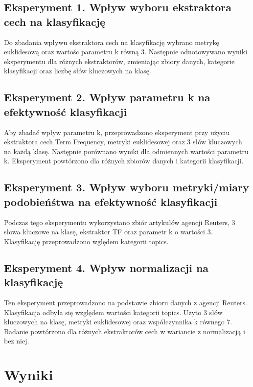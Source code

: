 \documentclass{classrep}
\begin{document}
\subsection{Eksperyment 1. Wpływ wyboru ekstraktora cech na klasyfikację}
Do zbadania wpływu ekstraktora cech na klasyfikację wybrano metrykę euklidesową oraz wartośc parametru k równą 3. Następnie odnotowywano wyniki eksperymentu dla różnych ekstraktorów, zmieniając zbiory danych, kategorie klasyfikacji oraz liczbę słów kluczowych na klasę. 
\subsection{Eksperyment 2. Wpływ parametru k na efektywność klasyfikacji}
Aby zbadać wpływ parametru k, przeprowadzono eksperyment przy użyciu ekstraktora cech Term Frequency, metryki euklidesowej oraz 3 słów kluczowych na każdą klasę. Następnie porównano wyniki dla odmiennych wartości parametru k. Eksperyment powtórzono dla różnych zbiorów danych i kategorii klasyfikacji. 
\subsection{Eksperyment 3. Wpływ wyboru metryki/miary podobieńśtwa na efektywność klasyfikacji}
Podczas tego eksperymentu wykorzystano zbiór artykułów agencji Reuters, 3 słowa kluczowe na klasę, ekstraktor TF oraz parametr k o wartości 3. Klasyfikację przeprowadzono wględem kategorii topics.
\subsection{Eksperyment 4. Wpływ normalizacji na klasyfikację}
Ten eksperyment przeprowadzono na podstawie zbioru danych z agencji Reuters. Klasyfikacja odbyła się względem wartości kategorii topics. Użyto 3 słów kluczowych na klasę, metryki euklidesowej oraz współczynnika k równego 7. Badanie powtórzono dla różnych ekstraktorów cech w wariancie z normalizacją i bez niej.
\newpage
\section{Wyniki}
\end{document}
